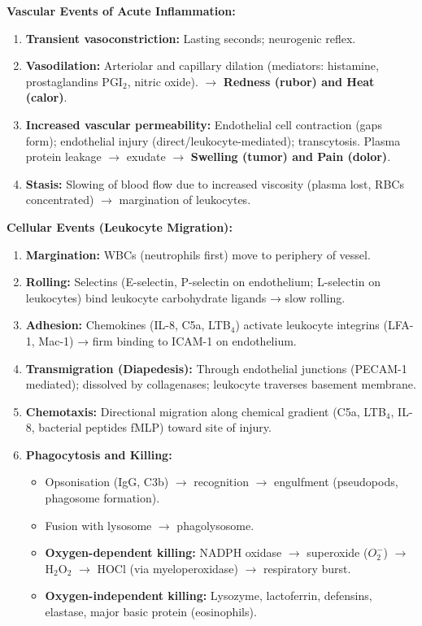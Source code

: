 \documentclass[11pt,a4paper]{article}
\begin{document}
\begin{ansbox}
\textbf{Vascular Events of Acute Inflammation:}
\begin{enumerate}[leftmargin=*]
    \item \textbf{Transient vasoconstriction:} Lasting seconds; neurogenic reflex.
    \item \textbf{Vasodilation:} Arteriolar and capillary dilation (mediators: histamine, prostaglandins PGI$_2$, nitric oxide). $\rightarrow$ \textbf{Redness (rubor) and Heat (calor)}.
    \item \textbf{Increased vascular permeability:} Endothelial cell contraction (gaps form); endothelial injury (direct/leukocyte-mediated); transcytosis. Plasma protein leakage $\rightarrow$ exudate $\rightarrow$ \textbf{Swelling (tumor) and Pain (dolor)}.
    \item \textbf{Stasis:} Slowing of blood flow due to increased viscosity (plasma lost, RBCs concentrated) $\rightarrow$ margination of leukocytes.
\end{enumerate}

\textbf{Cellular Events (Leukocyte Migration):}
\begin{enumerate}[leftmargin=*]
    \item \textbf{Margination:} WBCs (neutrophils first) move to periphery of vessel.
    \item \textbf{Rolling:} Selectins (E-selectin, P-selectin on endothelium; L-selectin on leukocytes) bind leukocyte carbohydrate ligands → slow rolling.
    \item \textbf{Adhesion:} Chemokines (IL-8, C5a, LTB$_4$) activate leukocyte integrins (LFA-1, Mac-1) → firm binding to ICAM-1 on endothelium.
    \item \textbf{Transmigration (Diapedesis):} Through endothelial junctions (PECAM-1 mediated); dissolved by collagenases; leukocyte traverses basement membrane.
    \item \textbf{Chemotaxis:} Directional migration along chemical gradient (C5a, LTB$_4$, IL-8, bacterial peptides fMLP) toward site of injury.
    \item \textbf{Phagocytosis and Killing:}
    \begin{itemize}
        \item Opsonisation (IgG, C3b) $\rightarrow$ recognition $\rightarrow$ engulfment (pseudopods, phagosome formation).
        \item Fusion with lysosome $\rightarrow$ phagolysosome.
        \item \textbf{Oxygen-dependent killing:} NADPH oxidase $\rightarrow$ superoxide ($O_2^-$) $\rightarrow$ H$_2$O$_2$ $\rightarrow$ HOCl (via myeloperoxidase) $\rightarrow$ respiratory burst.
        \item \textbf{Oxygen-independent killing:} Lysozyme, lactoferrin, defensins, elastase, major basic protein (eosinophils).
    \end{itemize}
\end{enumerate}


\end{ansbox}
\end{document}
